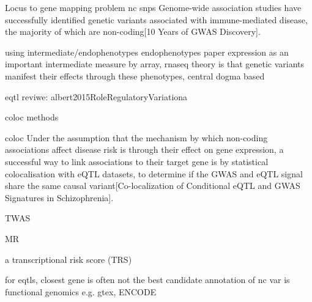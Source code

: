 \begin{outline}

\1 Locus to gene mapping problem
    \2 nc snps
        \3 Genome-wide association studies have successfully identified genetic variants associated with immune-mediated disease, the majority of which are non-coding[10 Years of GWAS Discovery].

\1 using intermediate/endophenotypes
    \2 endophenotypes paper
    \2 expression as an important intermediate
        \3 measure by array, rnaseq 
    \2 theory is that genetic variants manifest their effects through these phenotypes, central dogma based

    \1 eqtl reviwe: albert2015RoleRegulatoryVariationa

\1 coloc methods

    \2 coloc
        \3 Under the assumption that the mechanism by which non-coding associations affect disease risk is through their effect on gene expression, a successful way to link associations to their target gene is by statistical colocalisation with eQTL datasets, to determine if the GWAS and eQTL signal share the same causal variant[Co-localization of Conditional eQTL and GWAS Signatures in Schizophrenia].

    \2 TWAS

    \2 MR

    \2 a transcriptional risk score (TRS)

\1 for eqtls, closest gene is often not the best candidate
    \2 annotation of nc var is functional genomics
        \3 e.g. gtex, ENCODE
\end{outline}

